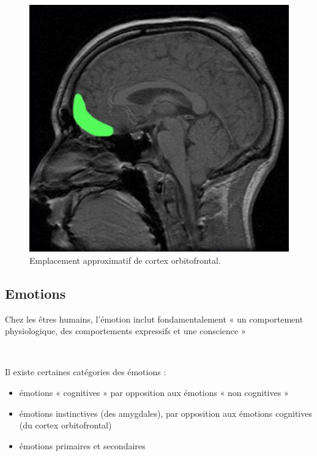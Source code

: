 \begin{figure}[th]
\centering
\includegraphics{Figures/3}
\decoRule
\caption[Cortex Orbifrontal]{Emplacement approximatif de cortex orbitofrontal.}
\label{fig:cortex}
\end{figure}


\subsection{Emotions}

Chez les êtres humains, l'émotion inclut fondamentalement « un comportement physiologique, des comportements expressifs et une conscience » \parencite{myers2004theories}

~\par
Il existe certaines catégories des émotions :

\begin{itemize}
\item émotions « cognitives » par opposition aux émotions « non cognitives »
\item émotions instinctives (des amygdales), par opposition aux émotions cognitives (du cortex orbitofrontal)
\item émotions primaires et secondaires
\end{itemize}

~\par

